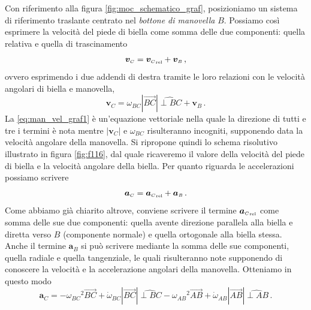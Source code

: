 \noindent Con riferimento alla figura \ref{fig:moc_schematico_graf},
posizioniamo un sistema di riferimento traslante centrato nel
{\em bottone di manovella} $B$. 
Possiamo cos\`i esprimere la velocit\`a del piede di biella come somma delle
due componenti:
quella relativa
e quella di trascinamento
\begin{equation}
{{\bm v}_{\scriptscriptstyle{C}}}= 
{{\bm v}_{\scriptscriptstyle{C}}}_{\scriptscriptstyle{{\rm rel}}}+
{{\bm v}_{\scriptscriptstyle{B}}}\,,
\label{eq:man_vel_graf0}
\end{equation}
\noindent ovvero esprimendo i due addendi di destra tramite le loro relazioni con
le velocit\`a angolari di biella e manovella,
\begin{equation}
{{\bm v}_{\scriptscriptstyle{C}}}= 
{\omega_{\scriptscriptstyle{BC}}}|\overrightarrow{BC}|\widehat{{\perp{BC}}}+
{{\bm v}_{\scriptscriptstyle{B}}}\,.
\label{eq:man_vel_graf1}
\end{equation}
\noindent La \ref{eq:man_vel_graf1} \`e un'equazione vettoriale nella quale
la direzione di tutti e tre i termini \`e nota
mentre $|{{\bm v}_{\scriptscriptstyle{C}}}|$ e 
${\omega_{\scriptscriptstyle{BC}}}$ risulteranno incogniti, supponendo data
la velocit\`a angolare della manovella. Si ripropone quindi
lo schema risolutivo illustrato in figura \ref{fig:f116},
dal quale ricaveremo
il valore della velocit\`a del piede di biella e la velocit\`a angolare
della biella.
Per quanto riguarda le accelerazioni possiamo scrivere
\begin{equation}
{{\bm a}_{\scriptscriptstyle{C}}}= 
{{\bm a}_{\scriptscriptstyle{C}}}_{\scriptscriptstyle{{\rm rel}}}+ 
{{\bm a}_{\scriptscriptstyle{B}}}\,. 
\label{eq:acc_man_graf0}
\end{equation}
\noindent Come abbiamo gi\`a chiarito altrove, conviene scrivere il termine
${{\bm a}_{\scriptscriptstyle{C}}}_{\scriptscriptstyle{{\rm rel}}}$
 come somma delle sue due
componenti: quella avente direzione parallela alla biella e diretta verso $B$
(componente normale) e quella ortogonale alla biella stessa.
Anche il termine ${{\bm a}_{\scriptscriptstyle{B}}}$ si pu\`o scrivere 
mediante la somma delle sue componenti,
quella radiale e quella tangenziale, le quali
risulteranno note
supponendo di conoscere la velocit\`a e la accelerazione angolari della
manovella.  Otteniamo in questo modo
\begin{equation}
{{\bm a}_{\scriptscriptstyle{C}}}= 
-{\omega_{\scriptscriptstyle{BC}}}^2 \overrightarrow{BC}+
{\dot\omega_{\scriptscriptstyle{BC}}}|\overrightarrow{BC}|\widehat{{\perp{BC}}}
-{\omega_{\scriptscriptstyle{AB}}}^2 \overrightarrow{AB}+
{\dot\omega_{\scriptscriptstyle{AB}}}|\overrightarrow{AB}|\widehat{{\perp{AB}}}\,.
\label{eq:acc_man_graf1}
\end{equation}
